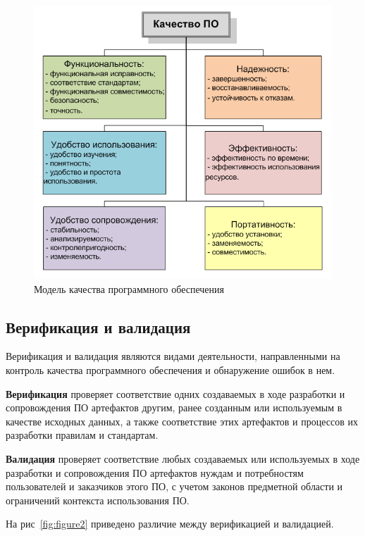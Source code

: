 \begin{figure}[h!]
    \begin{center}
        \includegraphics[]{img/quality_chars_iso.png}
    \end{center}
    \caption{Модель качества программного обеспечения}
    \label{fig:figure1}
\end{figure}

\subsection{Верификация и валидация} %

Верификация и валидация являются видами деятельности, направленными на контроль
качества программного обеспечения и обнаружение ошибок в нем.

\textbf{Верификация} проверяет соответствие одних создаваемых в ходе разработки
и сопровождения ПО артефактов другим, ранее созданным или используемым в
качестве исходных данных, а также соответствие этих артефактов и процессов их
разработки правилам и стандартам.

\textbf{Валидация} проверяет соответствие любых создаваемых или используемых в
ходе разработки и сопровождения ПО артефактов нуждам и потребностям
пользователей и заказчиков этого ПО, с учетом законов предметной области и
ограничений контекста использования ПО.

На рис~\ref{fig:figure2} приведено различие между верификацией и валидацией.

